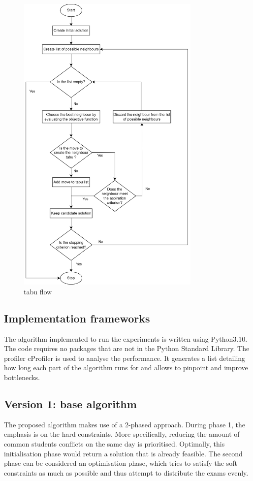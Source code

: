 \begin{figure}[h]
	\centering
	\includegraphics[width=0.8\textwidth]{images/tabu.png} 
	\caption{\acrlong{tabu} flow}
	\label{fig:tabu-chart}
\end{figure}

\subsection{Implementation frameworks}

The algorithm implemented to run the experiments is written using Python3.10. The code requires no packages that are not in the Python Standard Library. The profiler cProfiler is used to analyse the performance. It generates a list detailing how long each part of the algorithm runs for and allows to pinpoint and improve bottlenecks.

\subsection{Version 1: base algorithm}
The proposed algorithm makes use of a 2-phased approach. During phase 1, the emphasis is on the hard constraints. More specifically, reducing the amount of common students conflicts on the same day is prioritised. Optimally, this initialisation phase would return a solution that is already feasible. The second phase can be considered an optimisation phase, which tries to satisfy the soft constraints as much as possible and thus attempt to distribute the exams evenly.

